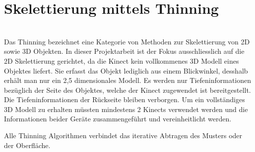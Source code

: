 \section{Skelettierung mittels Thinning}
\\
Das Thinning bezeichnet eine Kategorie von Methoden zur Skelettierung von 2D sowie 3D Objekten. In dieser Projektarbeit ist der Fokus ausschliesslich auf die 2D Skelettierung gerichtet, da die Kinect kein vollkommenes 3D Modell eines Objektes liefert. Sie erfasst das Objekt lediglich aus einem Blickwinkel, desshalb erhält man nur ein 2,5 dimensionales Modell. Es werden nur Tiefeninformationen bezüglich der Seite des Objektes, welche der Kinect zugewendet ist bereitgestellt. Die  Tiefeninformationen der Rückseite bleiben verborgen. Um ein vollständiges 3D Modell zu erhalten müssten mindestens 2 Kinects verwendet werden und die Informationen beider Geräte zusammengeführt und vereinheitlicht werden. 

Alle Thinning Algorithmen verbindet das iterative Abtragen des Musters oder der Oberfläche.

